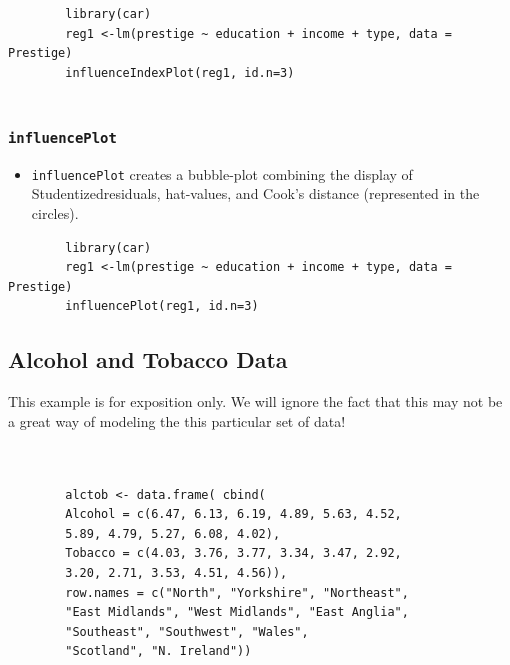\documentclass[main.tex]{subfiles}
\begin{document}
	\begin{framed}
		\begin{verbatim}
		library(car)
		reg1 <-lm(prestige ~ education + income + type, data = Prestige)
		influenceIndexPlot(reg1, id.n=3)
		
		\end{verbatim}
	\end{framed}
	
	
	
	\subsubsection*{\texttt{influencePlot}}
	\begin{itemize}
		\item \texttt{influencePlot} creates a bubble-plot combining the display of Studentizedresiduals, hat-values, and Cook's distance (represented in the circles).
	\end{itemize}
	
	\begin{framed}
		\begin{verbatim}
		library(car)
		reg1 <-lm(prestige ~ education + income + type, data = Prestige)
		influencePlot(reg1, id.n=3)
		\end{verbatim}
	\end{framed}
	
	\bigskip
	\subsection{Alcohol and Tobacco Data}
	This example is for exposition only. We will ignore the fact that this may not be a great way of modeling the this particular set of data!
	
	\begin{framed}
		\begin{verbatim}
		
		
		alctob <- data.frame( cbind(
		Alcohol = c(6.47, 6.13, 6.19, 4.89, 5.63, 4.52, 
		5.89, 4.79, 5.27, 6.08, 4.02),
		Tobacco = c(4.03, 3.76, 3.77, 3.34, 3.47, 2.92, 
		3.20, 2.71, 3.53, 4.51, 4.56)),
		row.names = c("North", "Yorkshire", "Northeast", 
		"East Midlands", "West Midlands", "East Anglia", 
		"Southeast", "Southwest", "Wales", 
		"Scotland", "N. Ireland"))
		
		
		\end{verbatim}
	\end{framed}
	
\end{document}
